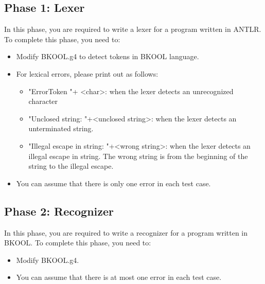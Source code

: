 \documentclass[11pt]{article}
\begin{document}
\subsection{Phase 1: Lexer}
In this phase, you are required to write a lexer for a program written in ANTLR. To complete this phase, you need to:
\begin{itemize}
\item Modify BKOOL.g4 to detect tokens in BKOOL language. 
\item For lexical errors, please print out as follows:
\begin{itemize}
\item "ErrorToken "+ <char>: when the lexer detects an unrecognized character
\item "Unclosed string: "+<unclosed string>: when the lexer detects an unterminated string.
\item "Illegal escape in string: "+<wrong string>: when the lexer detects an illegal escape in string. The wrong string is from the beginning of the string to the illegal escape.
\end{itemize}
\item You can assume that there is only one error in each test case.
\end{itemize}

\subsection{Phase 2: Recognizer}
In this phase, you are required to write a recognizer for a program written in BKOOL. To complete this phase, you need to:
\begin{itemize}
\item Modify BKOOL.g4.
\item You can assume that there is at most one error in each test case.
\end{itemize}
\end{document}
